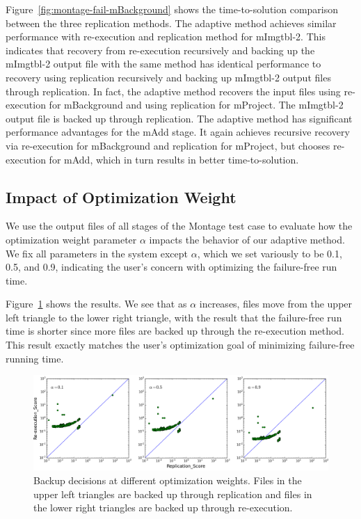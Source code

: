 \documentclass{sig-alternate}
\newcommand{\katznote}[1]{ {\textcolor{blue}    { ***Dan:      #1 }}}
\newcommand{\kylenote}[1]{{\textcolor{orange}    { ***Kyle:      #1 }}}
\newcommand{\katznote}[1]{}
\newcommand{\kylenote}[1]{}
\begin{document}
Figure~\ref{fig:montage-fail-mBackground} shows the time-to-solution comparison between the three replication methods. 
The adaptive method achieves similar performance with re-execution and replication method for mImgtbl-2. 
This indicates that recovery from re-execution recursively and backing up the mImgtbl-2 output file with the same method has identical performance to recovery using replication recursively and backing up mImgtbl-2 output files through replication. 
In fact, the adaptive method recovers the input files using re-execution for mBackground and using replication for mProject. The mImgtbl-2 output file is backed up through replication.
The adaptive method has significant performance advantages for the mAdd stage.
It again achieves recursive recovery via re-execution for mBackground and replication for mProject,
but chooses re-execution for mAdd, which in turn results in better time-to-solution.



\subsection{Impact of Optimization Weight}
\label{sec:Perf:Weight}
We use the output files of all stages of the Montage test case to evaluate how the optimization weight parameter $\alpha$ impacts the behavior of our adaptive method. %
We fix all parameters in the system except $\alpha$, which we set variously to be 0.1, 0.5, and 0.9, indicating the user's concern with optimizing the failure-free run time.


Figure~\ref{fig:weight} shows the results. We see that as $\alpha$ increases, files move from the upper left triangle to the lower right triangle, with the result that the failure-free run time is shorter since more files are backed up through the re-execution method.
This result exactly matches the user's optimization goal of minimizing failure-free running time.

\begin{figure}[ht]
	\begin{center}
		\includegraphics[width=160mm]{pictures/weight}
		\vspace{-10pt}
		\caption{Backup decisions at different optimization weights. Files in the upper left triangles are backed up through replication and files in the lower right triangles are backed up through re-execution.
		\label{fig:weight}}
  	\end{center}
\end{figure}
\end{document}
